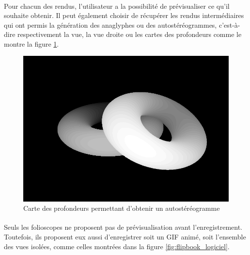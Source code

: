 \paragraph{}

Pour chacun des rendus, l'utilisateur a la possibilité de prévisualiser ce qu'il souhaite obtenir. Il peut également choisir de récupérer les rendus intermédiaires qui ont permis la génération des anaglyphes ou des autostéréogrammes, c'est-à-dire respectivement la vue, la vue droite ou les cartes des profondeurs comme le montre la figure \ref{fig:depthLogiciel}.

\begin{figure}[h]
	\centering
	\includegraphics[scale=0.4]{depth_logiciel.png}
	\caption{\label{fig:depthLogiciel} Carte des profondeurs permettant d'obtenir un autostéréogramme \protect}
\end{figure}

\paragraph{}
Seuls les folioscopes ne proposent pas de prévisualisation avant l'enregistrement. Toutefois, ils proposent eux aussi d'enregistrer soit un GIF animé, soit l'ensemble des vues isolées, comme celles montrées dans la figure \ref{fig:flipbook_logiciel}.

